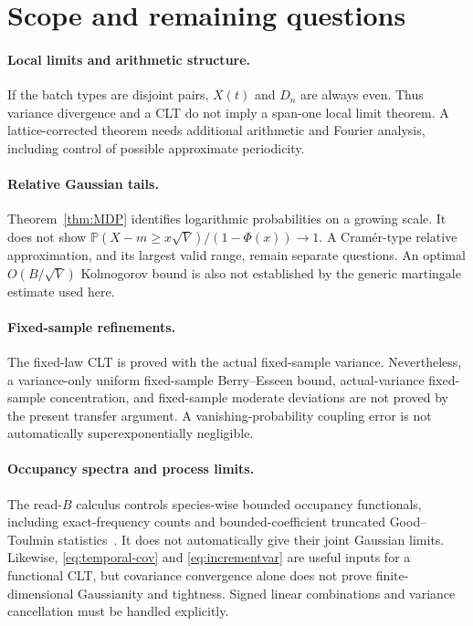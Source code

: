 \documentclass[11pt]{article}
\numberwithin{equation}{section}
\theoremstyle{definition}
\theoremstyle{remark}
\newcommand{\Pp}{\mathbb P}
\begin{document}
\section{Scope and remaining questions}\label{sec:scope}

\paragraph{Local limits and arithmetic structure.}
If the batch types are disjoint pairs, $X(t)$ and $D_n$ are always even.
Thus variance divergence and a CLT do not imply a span-one local limit theorem.
A lattice-corrected theorem needs additional arithmetic and Fourier analysis,
including control of possible approximate periodicity.

\paragraph{Relative Gaussian tails.}
Theorem~\ref{thm:MDP} identifies logarithmic probabilities on a growing scale.
It does not show
$\Pp(X-m\ge x\sqrt V)/(1-\Phi(x))\to1$. A Cram\'er-type relative approximation,
and its largest valid range, remain separate questions. An optimal
$O(B/\sqrt V)$ Kolmogorov bound is also not established by the generic
martingale estimate used here.

\paragraph{Fixed-sample refinements.}
The fixed-law CLT is proved with the actual fixed-sample variance. Nevertheless,
a variance-only uniform fixed-sample Berry--Esseen bound, actual-variance
fixed-sample concentration, and fixed-sample moderate deviations are not proved
by the present transfer argument. A vanishing-probability coupling error is
not automatically superexponentially negligible.

\paragraph{Occupancy spectra and process limits.}
The read-$B$ calculus controls species-wise bounded occupancy functionals,
including exact-frequency counts and bounded-coefficient truncated
Good--Toulmin statistics~\cite{GoodToulmin}. It does not automatically give their joint Gaussian
limits. Likewise, \eqref{eq:temporal-cov} and \eqref{eq:incrementvar} are useful
inputs for a functional CLT, but covariance convergence alone does not prove
finite-dimensional Gaussianity and tightness. Signed linear combinations and
variance cancellation must be handled explicitly.
\end{document}
